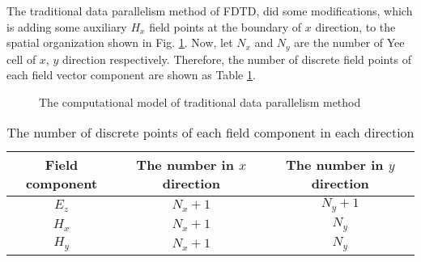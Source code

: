 The traditional data parallelism method of FDTD, did some modifications, which is adding some auxiliary $H_x$ field points at the boundary of $x$ direction, to the spatial organization shown in Fig. \ref{ch3 fig:2d old}. Now, let $N_x$ and $N_y$ are the number of Yee cell of $x$, $y$ direction respectively. Therefore, the number of discrete field points of each field vector component are shown as Table \ref{ch3 table: old number}.

\begin{figure}
	\centering
	\def \xcells {7}
	\def \ycells {7}
	\def \cell {1.2}
	\caption{The computational model of traditional data parallelism method}
	\label{ch3 fig:2d old}
\end{figure}


\begin{table}[hp]
\centering
\caption{The number of discrete points of each field component in each direction}
\label{ch3 table: old number}
\begin{tabular}{ccc}
	\toprule
	Field component & The number in $x$ direction & The number in $y$ direction\\
	
	\midrule
	$E_z$ & $N_x+1$ & $N_y+1$\\
	$H_x$ & $N_x+1$ & $N_y$\\
	$H_y$ & $N_x+1$ & $N_y$\\
	\bottomrule
\end{tabular}
\end{table}

